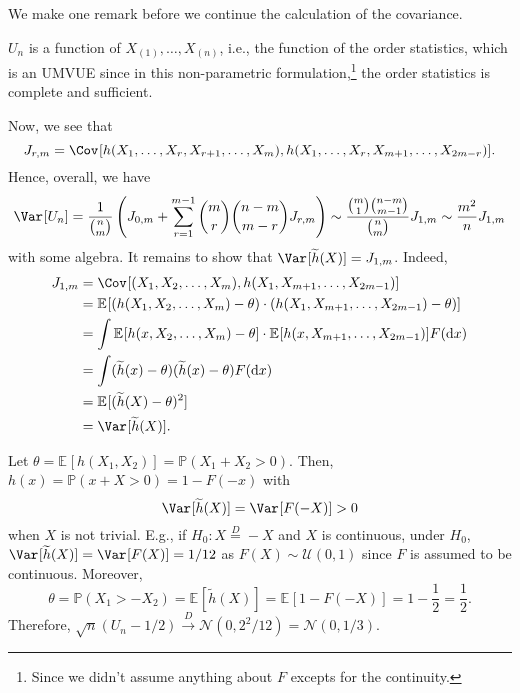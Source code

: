 We make one remark before we continue the calculation of the covariance.
\begin{remark}
	\(U_n\) is a function of \(X_{(1)}, \dots , X_{(n)}\), i.e., the function of the order statistics, which is an UMVUE since in this non-parametric formulation,\footnote{Since we didn't assume anything about \(F\) excepts for the continuity.} the order statistics is complete and sufficient.
\end{remark}

Now, we see that
\[
	J_{r, m}
	= \Cov_{}[h(X_1, \dots , X_r, X_{r+1}, \dots , X_m), h(X_1, \dots , X_r, X_{m+1}, \dots , X_{2m-r})].
\]
Hence, overall, we have
\[
	\Var_{}[U_n]
	= \frac{1}{\binom{n}{m}} \left( J_{0, m} + \sum_{r=1}^{m-1} \binom{m}{r} \binom{n-m}{m-r} J_{r, m} \right)
	\sim \frac{\binom{m}{1} \binom{n-m}{m-1}}{\binom{n}{m}} J_{1, m}
	\sim \frac{m^2}{n} J_{1, m}
\]
with some algebra. It remains to show that \(\Var_{}[\widetilde{h} (X)] = J_{1, m}\). Indeed,
\[
	\begin{split}
		J_{1, m}
		 & = \Cov_{}[(X_1, X_2, \dots , X_m), h(X_1, X_{m+1}, \dots , X_{2m-1})]                                                       \\
		 & = \mathbb{E}_{}[(h(X_1, X_2, \dots , X_m) - \theta ) \cdot (h(X_1, X_{m+1}, \dots , X_{2m-1}) - \theta ) ]                  \\
		 & = \int \mathbb{E}_{}[h(x, X_2, \dots , X_m) - \theta ] \cdot \mathbb{E}_{}[h(x, X_{m+1}, \dots , X_{2m-1})] F(\mathrm{d} x) \\
		 & = \int (\widetilde{h} (x) - \theta ) (\widetilde{h} (x) - \theta ) F(\mathrm{d} x)                                          \\
		 & = \mathbb{E}_{}[(\widetilde{h} (X) - \theta )^2]                                                                            \\
		 & = \Var_{}[\widetilde{h} (X)] .
	\end{split}
\]

\begin{eg}
	Let \(\theta = \mathbb{E}_{}[h(X_1, X_2)] = \mathbb{P} (X_1 + X_2 > 0)\). Then, \(h(x) = \mathbb{P} (x + X > 0) = 1 - F(-x)\) with
	\[
		\Var_{}[\widetilde{h} (X)]
		= \Var_{}[F(-X)]
		> 0
	\]
	when \(X\) is not trivial. E.g., if \(H_0 \colon X \overset{D}{=} -X \) and \(X\) is continuous, under \(H_0\), \(\Var_{}[\widetilde{h} (X)] = \Var_{}[F(X)] = 1 / 12\) as \(F(X) \sim \mathcal{U} (0, 1)\) since \(F\) is assumed to be continuous. Moreover,
	\[
		\theta
		= \mathbb{P} (X_1 > -X_2)
		= \mathbb{E}_{}[\widetilde{h} (X)]
		= \mathbb{E}_{}[1 - F(-X)]
		= 1 - \frac{1}{2}
		= \frac{1}{2}.
	\]
	Therefore, \(\sqrt{n} ( U_n - 1 / 2 ) \overset{D}{\to} \mathcal{N} ( 0, 2^2 / 12 ) = \mathcal{N} ( 0, 1 / 3 ) \).
\end{eg}

